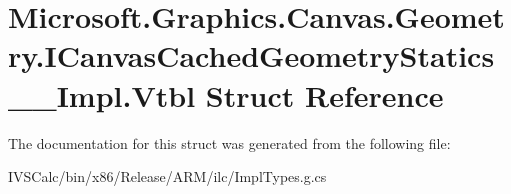 \hypertarget{struct_microsoft_1_1_graphics_1_1_canvas_1_1_geometry_1_1_i_canvas_cached_geometry_statics_____impl_1_1_vtbl}{}\section{Microsoft.\+Graphics.\+Canvas.\+Geometry.\+I\+Canvas\+Cached\+Geometry\+Statics\+\_\+\+\_\+\+Impl.\+Vtbl Struct Reference}
\label{struct_microsoft_1_1_graphics_1_1_canvas_1_1_geometry_1_1_i_canvas_cached_geometry_statics_____impl_1_1_vtbl}


The documentation for this struct was generated from the following file\+:\begin{DoxyCompactItemize}
\item 
I\+V\+S\+Calc/bin/x86/\+Release/\+A\+R\+M/ilc/Impl\+Types.\+g.\+cs\end{DoxyCompactItemize}
